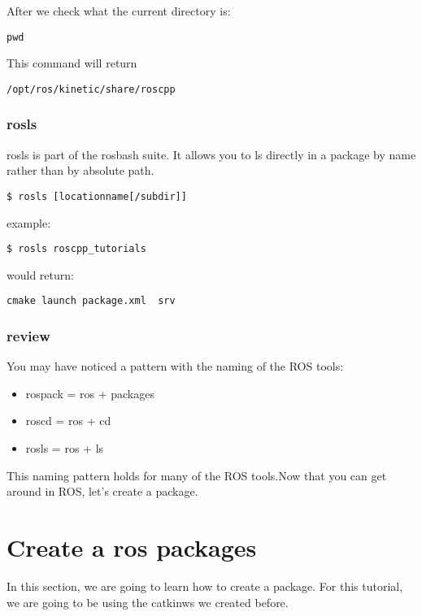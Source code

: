 After we check what the current directory is:
\begin{lstlisting}[breaklines=True language=bash]
pwd
\end{lstlisting}

This command will return
\begin{lstlisting}[breaklines=True language=bash]
	/opt/ros/kinetic/share/roscpp
\end{lstlisting}


\subsubsection{rosls}
rosls is part of the rosbash suite. It allows you to ls directly in a package by name rather than by absolute path.

\begin{lstlisting}[breaklines=True language=bash]
$ rosls [locationname[/subdir]]
\end{lstlisting}

example:
\begin{lstlisting}[breaklines=True language=bash]
$ rosls roscpp_tutorials
\end{lstlisting}

would return:
\begin{lstlisting}[breaklines=True language=bash]
	cmake launch package.xml  srv
\end{lstlisting}

\subsubsection{review}
You may have noticed a pattern with the naming of the ROS tools:
\begin{itemize}
	\item rospack = ros + packages
	\item roscd = ros + cd
	\item rosls = ros + ls
\end{itemize}
This naming pattern holds for many of the ROS tools.Now that you can get around in ROS, let's create a package.

\newpage
\pagebreak

\section{Create a ros packages}
In this section, we are going to learn how to create a package. For this tutorial, we are going to be using the catkin\textunderscore ws we created before.

